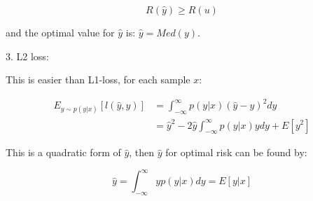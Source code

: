 \documentclass{article}
\begin{document}
$$
R(\hat{y})\geq R(u)
$$

and the optimal value for $\hat{y}$ is: $\hat{y}=Med(y)$.

3. L2 loss:

This is easier than L1-loss, for each sample $x$:

$$
\begin{aligned}
    E_{y\sim p(y|x)}[l(\hat{y},y)] &= \int_{-\infty}^{\infty} p(y|x)(\hat{y}-y)^2dy\\
    &=\hat{y}^2-2\hat{y}\int_{-\infty}^{\infty}p(y|x)ydy+E[y^2]
\end{aligned}
$$

This is a quadratic form of $\hat{y}$, then $\hat{y}$ for optimal risk can be found by:

$$
\hat{y} = \int_{-\infty}^{\infty}yp(y|x)dy=E[y|x]
$$
\end{document}
